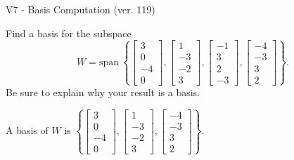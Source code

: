 \begin{exercise}
  \begin{exerciseTitle}V7 - Basis Computation (ver. 119)\end{exerciseTitle}
  \begin{exerciseStatement}
    Find a basis for the subspace 
\[W=\mathrm{span}\ \left\{\left[\begin{array}{r}
3 \\
0 \\
-4 \\
0
\end{array}\right] , \left[\begin{array}{r}
1 \\
-3 \\
-2 \\
3
\end{array}\right] , \left[\begin{array}{r}
-1 \\
3 \\
2 \\
-3
\end{array}\right] , \left[\begin{array}{r}
-4 \\
-3 \\
3 \\
2
\end{array}\right]\right\}.\]
 Be sure to explain why your result is a basis.


  \end{exerciseStatement}
  \begin{exerciseAnswer}
   A basis of \(W\) is  \(\left\{\left[\begin{array}{r}
3 \\
0 \\
-4 \\
0
\end{array}\right] , \left[\begin{array}{r}
1 \\
-3 \\
-2 \\
3
\end{array}\right] , \left[\begin{array}{r}
-4 \\
-3 \\
3 \\
2
\end{array}\right]\right\}\).
  


  \end{exerciseAnswer}
\end{exercise}